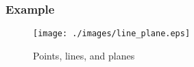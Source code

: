 \begin{frame}
\frametitle{Example}

%
\begin{figure}[h]
  \texttt{[image: ./images/line\_plane.eps]}
  \caption{Points, lines, and planes}
  \label{fig:points_lines_planes}
\end{figure}
%
\end{frame}
